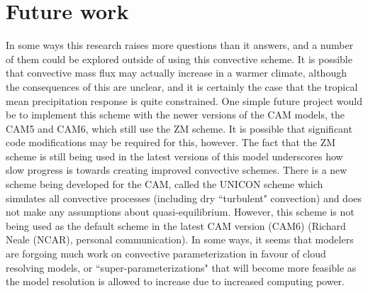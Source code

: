 \documentclass[letterpaper,12pt,titlepage,oneside,final]{book}
\let\origdoublepage\cleardoublepage
\newcommand{\clearemptydoublepage}{%
  \clearpage{\pagestyle{empty}\origdoublepage}}
\let\cleardoublepage\clearemptydoublepage
\begin{document}
\section{Future work}
In some ways this research raises more questions than it answers, and a number of them could be explored outside of using this convective scheme. It is possible that convective mass flux may actually increase in a warmer climate, although the consequences of this are unclear, and it is certainly the case that the tropical mean precipitation response is quite constrained. One simple future project would be to implement this scheme with the newer versions of the CAM models, the CAM5 and CAM6, which still use the ZM scheme. It is possible that significant code modifications may be required for this, however. The fact that the ZM scheme is still being used in the latest versions of this model underscores how slow progress is towards creating improved convective schemes. There is a new scheme being developed for the CAM, called the UNICON scheme \citep{park_unified_2014,park_unified_2014-1} which simulates all convective processes (including dry ``turbulent" convection) and does not make any assumptions about quasi-equilibrium. However, this scheme is not being used as the default scheme in the latest CAM version (CAM6) (Richard Neale (NCAR), personal communication). In some ways, it seems that modelers are forgoing much work on convective parameterization in favour of cloud resolving models, or ``super-parameterizations" \citep{li_super-parameterization:_2012} that will become more feasible as the model resolution is allowed to increase due to increased computing power.






\cleardoublepage %
\renewcommand*{\bibname}{References}
\end{document}
